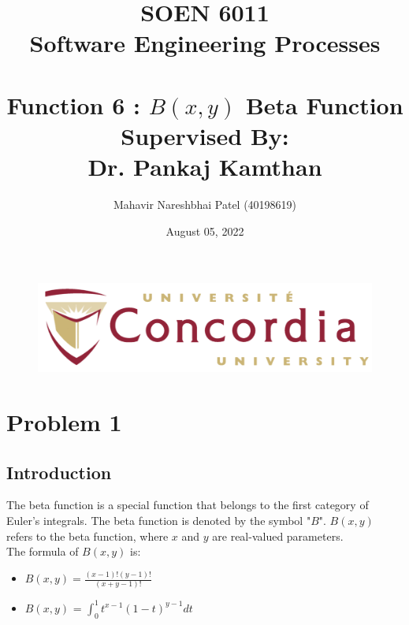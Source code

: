 \documentclass[12pt,a4paper]{report}
\begin{document}
\begin{figure}
    \centering
    \begin{center}
    \includegraphics[width=1.0\linewidth]{Images/concordia_university_system_logo.png}    
    \end{center}
    \label{fig:Concordia University Logo.}
\end{figure}

\title{SOEN 6011\\ Software Engineering Processes\\[3.0em] 

 \\
\textbf{Function 6 :  $B(x,y)$ Beta Function} \\[1.5em] Supervised By:\\ Dr. Pankaj Kamthan}

\author{Mahavir Nareshbhai Patel (40198619) }
\date{August 05, 2022}


\maketitle

\setcounter{page}{0}




\chapter{Problem 1}

\section{Introduction}
The beta function is a special function that belongs to the first category of Euler's integrals. The beta function is denoted by the symbol  "${B}$". $B(x,y)$ refers to the beta function, where $x$ and $y$ are real-valued parameters. \\
The formula of \textbf{$B(x,y)$} is:
    \begin{itemize}
        \item $B(x,y) = \frac{(x-1)! (y-1)!}{(x+y-1)!}$ \cite{1}
        \item $B(x,y)$ = $\int_{0}^{1} {t^{x-1}}{(1-t)^{y-1}} dt$ 
    \end{itemize}
\end{document}
